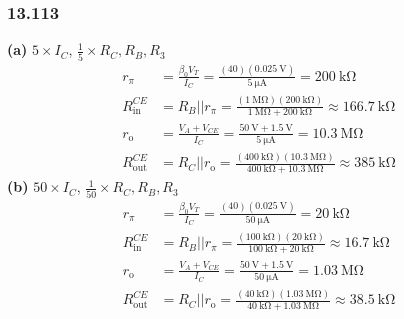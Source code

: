 \documentclass[11pt,a4paper,titlepage]{article}
\begin{document}
\subsubsection*{13.113}
\textbf{(a)} $5 \times I_C$, $\frac{1}{5} \times R_C,R_B,R_3$ 
\begin{equation}
\begin{aligned}
r_{\pi} &= \frac{\beta_0V_T}{I_C} = \frac{(40)(\SI{0.025}{\volt})}{\SI{5}{\micro\ampere}} = \SI{200}{\kilo\ohm} \\
R_{\text{in}}^{CE} &= R_B || r_{\pi} =  \frac{(\SI{1}{\mega\ohm})(\SI{200}{\kilo\ohm})}{\SI{1}{\mega\ohm}+\SI{200}{\kilo\ohm}} \approx \SI{166.7}{\kilo\ohm} \\
r_{\text{o}} &= \frac{V_A+V_{CE}}{I_C} = \frac{\SI{50}{\volt} + \SI{1.5}{\volt}}{\SI{5}{\micro\ampere}} = \SI{10.3}{\mega\ohm} \\
R_{\text{out}}^{CE} &= R_C || r_{\text{o}} = \frac{(\SI{400}{\kilo\ohm})(\SI{10.3}{\mega\ohm})}{\SI{400}{\kilo\ohm} + \SI{10.3}{\mega\ohm}} \approx \SI{385}{\kilo\ohm}
\end{aligned}
\end{equation}
\textbf{(b)} $50 \times I_C$, $\frac{1}{50} \times R_C,R_B,R_3$
\begin{equation}
\begin{aligned}
r_{\pi} &= \frac{\beta_0V_T}{I_C} = \frac{(40)(\SI{0.025}{\volt})}{\SI{50}{\micro\ampere}} = \SI{20}{\kilo\ohm} \\
R_{\text{in}}^{CE} &= R_B || r_{\pi} =  \frac{(\SI{100}{\kilo\ohm})(\SI{20}{\kilo\ohm})}{\SI{100}{\kilo\ohm}+\SI{20}{\kilo\ohm}} \approx \SI{16.7}{\kilo\ohm} \\
r_{\text{o}} &= \frac{V_A+V_{CE}}{I_C} = \frac{\SI{50}{\volt} + \SI{1.5}{\volt}}{\SI{50}{\micro\ampere}} = \SI{1.03}{\mega\ohm} \\
R_{\text{out}}^{CE} &= R_C || r_{\text{o}} = \frac{(\SI{40}{\kilo\ohm})(\SI{1.03}{\mega\ohm})}{\SI{40}{\kilo\ohm} + \SI{1.03}{\mega\ohm}} \approx \SI{38.5}{\kilo\ohm}
\end{aligned}
\end{equation}
\end{document}
